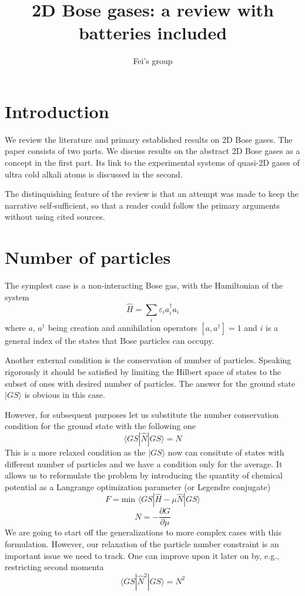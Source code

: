 \documentclass[8pt,letterpaper,notitlepage]{article}
\begin{document}
\title{2D Bose gases: a review with batteries included}
\author{Fei's group}
\maketitle

\section{Introduction}
We review the literature and primary established results on 2D Bose gases. The paper consists of two parts. We discuss results on the abstract  2D Bose gases as a concept in the first part.  Its link to the experimental systems of quasi-2D gases of ultra cold alkali atoms is discussed in the second.  

The distinquishing feature of the review is that an attempt was made to keep the narrative self-sufficient, so that a reader could follow the primary arguments without using cited sources.


\tableofcontents

\section{Number of particles}
The symplest case is a non-interacting Bose gas, with the Hamiltonian of the system 
\begin{equation}
\hat{H} = \sum_{i} \varepsilon_i a^{\dagger}_{i} a_{i}
\end{equation} 
where $a$, $a^{\dagger}$ being creation and annihilation operators $[a, a^{\dagger}] = 1$ and
$i$ is a general index of the states that Bose particles can occupy.

 Another external condition is the conservation of number of particles. Speaking rigorously it should be satisfied by limiting the Hilbert space of states to the subset of ones with desired number of particles. The answer for the ground state $|GS \rangle$ is obvious in this case. 

However, for subsequent purposes let us substitute the number conservation condition for the ground state with the following one
\[
\langle GS | \hat{N} | GS \rangle = N
\]
This is a more relaxed condition as the $| GS \rangle$ now can consitute of states with different number of particles and we have a condition only for the average. 
It allows us to reformulate the problem by introducing the quantity of chemical potential as a
Langrange optimization parameter (or Legendre conjugate)
\[
F = \textrm{min } \langle GS | \hat{H} - \mu \hat{N} | GS \rangle
 \]
\[
N = -\frac{\partial G}{\partial \mu}
\]
We are going to start off the generalizations to more complex cases with this formulation. However, our relaxation of the particle number constraint is an important issue we need to track.
One can improve upon it later on by, e.g., restricting second momenta
\[
\langle GS | \hat{N}^2 | GS \rangle = N^2
\]
\end{document}
